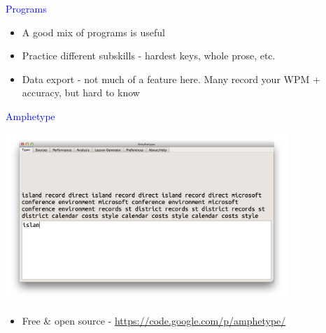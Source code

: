 \documentclass[landscape]{slides}
\begin{document}
\begin{slide}

    \textcolor{blue}{\Large{Programs}}

    \begin{itemize}
        \item A good mix of programs is useful
        \item Practice different subskills - hardest keys, whole prose, etc.
        \item Data export - not much of a feature here. Many record your WPM + accuracy, but hard to know
    \end{itemize}

\end{slide}


\begin{slide}

    \textcolor{blue}{\Large{Amphetype}}

    \centering

    \includegraphics[width=0.8\textwidth]{amphetype-screenshot}

    \begin{itemize}
        \item Free \& open source - \url{https://code.google.com/p/amphetype/}
    \end{itemize}

\end{slide}
\end{document}
